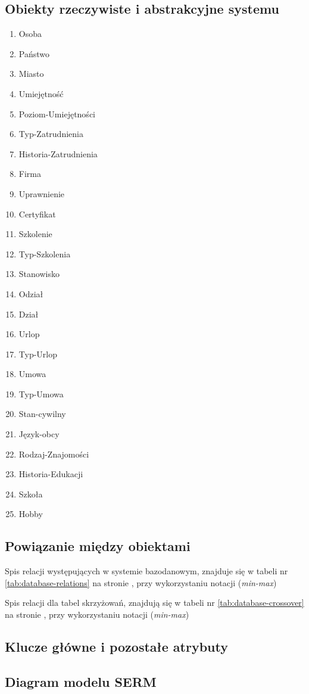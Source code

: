 \documentclass[a4paper]{article}
\begin{document}
\subsection{Obiekty rzeczywiste i abstrakcyjne systemu}
\begin{multicols}{2}
\begin{enumerate}


\item Osoba
\item Państwo
\item Miasto
\item Umiejętność
\item Poziom-Umiejętności
\item Typ-Zatrudnienia
\item Historia-Zatrudnienia
\item Firma
\item Uprawnienie
\item Certyfikat
\item Szkolenie
\item Typ-Szkolenia
\item Stanowisko
\item Odział
\item Dział
\item Urlop
\item Typ-Urlop
\item Umowa
\item Typ-Umowa
\item Stan-cywilny
\item Język-obcy
\item Rodzaj-Znajomości
\item Historia-Edukacji
\item Szkoła
\item Hobby
\end{enumerate}
\end{multicols}
\subsection{Powiązanie między obiektami}
Spis relacji występujących w systemie bazodanowym, znajduje się w tabeli nr \ref{tab:database-relations} na stronie \pageref{tab:database-relations}, przy wykorzystaniu notacji (\emph{min-max})



Spis relacji dla tabel skrzyżowań, znajdują się w tabeli nr \ref{tab:database-crossover} na stronie \pageref{tab:database-crossover}, przy wykorzystaniu notacji (\emph{min-max})



\subsection{Klucze główne i pozostałe atrybuty}

\subsection{Diagram modelu SERM}


\end{document}
